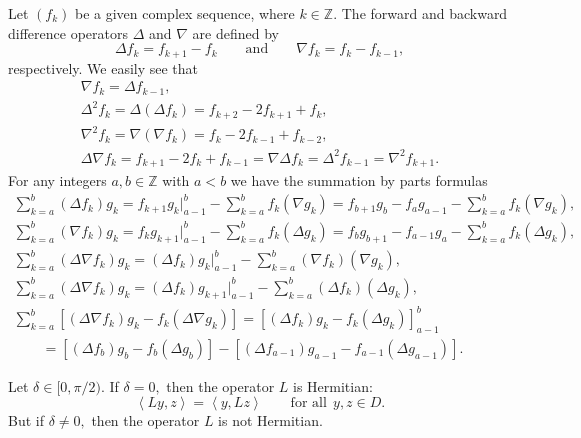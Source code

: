 \documentclass[pdftex]{sigma}
\numberwithin{equation}{section}
\begin{document}
Let $(f_{k})$ be a given complex sequence, where $k\in
\mathbb{Z}.$ The forward and backward dif\/ference operators $\Delta $ and $\nabla $ are
def\/ined by%
\[
\Delta f_{k}=f_{k+1}-f_{k}\qquad \text{and} \qquad \nabla f_{k}=f_{k}-f_{k-1},
\]%
respectively. We easily see that%
\begin{gather*}
\nabla f_{k}=\Delta f_{k-1},
\\
\Delta ^{2}f_{k}=\Delta (\Delta f_{k})=f_{k+2}-2f_{k+1}+f_{k},
\\
\nabla ^{2}f_{k}=\nabla (\nabla f_{k})=f_{k}-2f_{k-1}+f_{k-2},
\\
\Delta \nabla f_{k}=f_{k+1}-2f_{k}+f_{k-1}=\nabla \Delta f_{k}=\Delta
^{2}f_{k-1}=\nabla ^{2}f_{k+1}.
\end{gather*}
For any integers $a,b\in
\mathbb{Z}
$ with $a<b$ we have the summation by parts formulas%
\begin{gather}
\sum_{k=a}^{b}(\Delta f_{k})g_{k}=f_{k+1}g_{k}\big|_{a-1}^{b}-\sum_{k=a}^{b}f_{k}(\nabla
g_{k})=f_{b+1}g_{b}-f_{a}g_{a-1}-\sum_{k=a}^{b}f_{k}(\nabla g_{k}),
\nonumber\\
\sum_{k=a}^{b}(\nabla f_{k})g_{k}=f_{k}g_{k+1}\big|_{a-1}^{b}-\sum_{k=a}^{b}f_{k}(\Delta
g_{k})=f_{b}g_{b+1}-f_{a-1}g_{a}-\sum_{k=a}^{b}f_{k}(\Delta g_{k}),
\label{3.1}
\\
\sum_{k=a}^{b}(\Delta \nabla f_{k})g_{k}=(\Delta f_{k})g_{k}\big|_{a-1}^{b}-\sum_{k=a}^{b}(\nabla f_{k})(\nabla g_{k}),  \label{3.2}
\\
\sum_{k=a}^{b}(\Delta \nabla f_{k})g_{k}=(\Delta f_{k})g_{k+1}\big|_{a-1}^{b}-\sum_{k=a}^{b}(\Delta f_{k})(\Delta g_{k}),  \nonumber %
\\
\sum_{k=a}^{b}[(\Delta \nabla f_{k})g_{k}-f_{k}(\Delta \nabla
g_{k})]=[(\Delta f_{k})g_{k}-f_{k}(\Delta g_{k})]_{a-1}^{b}
\nonumber\\
\qquad{}
=[(\Delta f_{b})g_{b}-f_{b}(\Delta g_{b})]-[(\Delta
f_{a-1})g_{a-1}-f_{a-1}(\Delta g_{a-1})].  \label{3.4}
\end{gather}

\begin{theorem}
\label{Th3.1}Let $\delta \in \lbrack 0,\pi /2).$ If $\delta =0,$ then the
operator $L$ is Hermitian:%
\[
\left\langle Ly,z\right\rangle =\left\langle y,Lz\right\rangle \qquad \text{for all} \ \ y,z\in D.
\]%
But if $\delta \neq 0,$ then the operator $L$ is not Hermitian.
\end{theorem}
\end{document}
